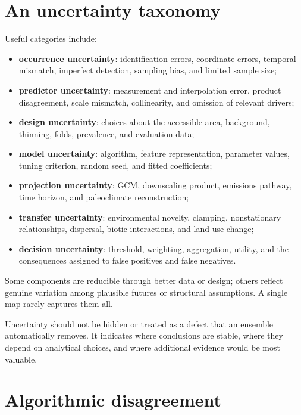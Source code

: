 \section{An uncertainty taxonomy}

Useful categories include:

\begin{itemize}
\item \textbf{occurrence uncertainty}: identification errors, coordinate errors, temporal mismatch, imperfect detection, sampling bias, and limited sample size;
\item \textbf{predictor uncertainty}: measurement and interpolation error, product disagreement, scale mismatch, collinearity, and omission of relevant drivers;
\item \textbf{design uncertainty}: choices about the accessible area, background, thinning, folds, prevalence, and evaluation data;
\item \textbf{model uncertainty}: algorithm, feature representation, parameter values, tuning criterion, random seed, and fitted coefficients;
\item \textbf{projection uncertainty}: GCM, downscaling product, emissions pathway, time horizon, and paleoclimate reconstruction;
\item \textbf{transfer uncertainty}: environmental novelty, clamping, nonstationary relationships, dispersal, biotic interactions, and land-use change;
\item \textbf{decision uncertainty}: threshold, weighting, aggregation, utility, and the consequences assigned to false positives and false negatives.
\end{itemize}

Some components are reducible through better data or design; others reflect genuine variation among plausible futures or structural assumptions. A single map rarely captures them all.

\begin{atencao}[title={\faExclamationTriangle\quad Uncertainty is not disposable error}]
Uncertainty should not be hidden or treated as a defect that an ensemble automatically removes. It indicates where conclusions are stable, where they depend on analytical choices, and where additional evidence would be most valuable.
\end{atencao}

\section{Algorithmic disagreement}

